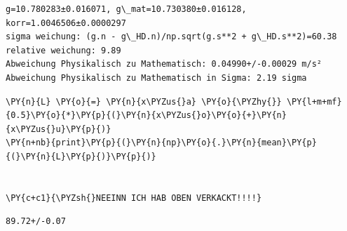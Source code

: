     \begin{Verbatim}[commandchars=\\\{\}]
g=10.780283±0.016071, g\_mat=10.730380±0.016128, korr=1.0046506±0.0000297
sigma weichung: (g.n - g\_HD.n)/np.sqrt(g.s**2 + g\_HD.s**2)=60.38
relative weichung: 9.89
Abweichung Physikalisch zu Mathematisch: 0.04990+/-0.00029 m/s²
Abweichung Physikalisch zu Mathematisch in Sigma: 2.19 sigma
    \end{Verbatim}

    \begin{tcolorbox}[breakable, size=fbox, boxrule=1pt, pad at break*=1mm,colback=cellbackground, colframe=cellborder]
\begin{Verbatim}[commandchars=\\\{\}]
\PY{n}{L} \PY{o}{=} \PY{n}{x\PYZus{}a} \PY{o}{\PYZhy{}} \PY{l+m+mf}{0.5}\PY{o}{*}\PY{p}{(}\PY{n}{x\PYZus{}o}\PY{o}{+}\PY{n}{x\PYZus{}u}\PY{p}{)}
\PY{n+nb}{print}\PY{p}{(}\PY{n}{np}\PY{o}{.}\PY{n}{mean}\PY{p}{(}\PY{n}{L}\PY{p}{)}\PY{p}{)}


\PY{c+c1}{\PYZsh{}NEEINN ICH HAB OBEN VERKACKT!!!!}
\end{Verbatim}
\end{tcolorbox}

    \begin{Verbatim}[commandchars=\\\{\}]
89.72+/-0.07
    \end{Verbatim}

    \begin{tcolorbox}[breakable, size=fbox, boxrule=1pt, pad at break*=1mm,colback=cellbackground, colframe=cellborder]
\begin{Verbatim}[commandchars=\\\{\}]

\end{Verbatim}
\end{tcolorbox}

